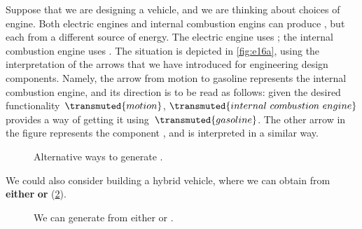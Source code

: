 \begin{example}
    Suppose that we are designing a vehicle, and we are thinking about choices of engine. Both electric engines and internal combustion engins can produce , but each from a different source of energy. The electric engine uses ; the internal combustion engine uses . The situation is depicted in \cref{fig:e16a}, using the interpretation of the arrows that we have introduced for engineering design components. Namely, the arrow from motion to gasoline represents the internal combustion engine, and its direction is to be read as follows: given the desired functionality~$\transmuted{motion}$, $\transmuted{internal \ combustion \ engine}$ provides a way of getting it using~$\transmuted{gasoline}$. The other arrow in the figure represents the component , and is interpreted in a similar way.


    \begin{figure}[h!]
        \centering
        \caption{Alternative ways to generate . \label{fig:e14}}
    \end{figure}

    We could also consider building a hybrid vehicle, where we can obtain  from \textbf{either}  \textbf{or}  (\cref{fig:e15}).

    \begin{figure}[h!]
        \centering
        \caption{We can generate  from either  or  . \label{fig:e15}}
    \end{figure}
\end{example}

